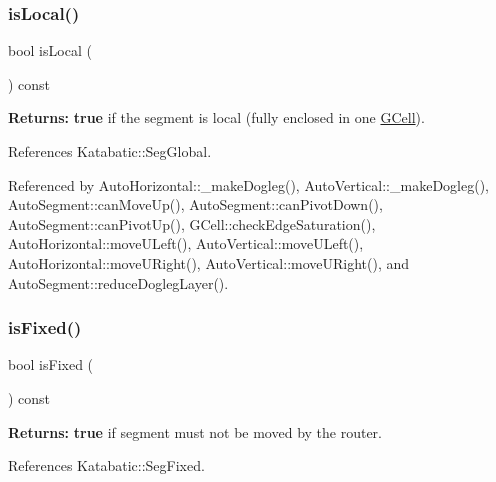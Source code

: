 \mbox{\label{classKatabatic_1_1AutoSegment_add556a145a89fdbcea82346abfb873dc}} 
\subsubsection{\texorpdfstring{is\+Local()}{isLocal()}}
{\footnotesize\ttfamily bool is\+Local (\begin{DoxyParamCaption}{ }\end{DoxyParamCaption}) const\hspace{0.3cm}{\ttfamily [inline]}}

{\bfseries Returns\+:} {\bfseries true} if the segment is local (fully enclosed in one \hyperlink{classKatabatic_1_1GCell}{G\+Cell}). 

References Katabatic\+::\+Seg\+Global.



Referenced by Auto\+Horizontal\+::\+\_\+make\+Dogleg(), Auto\+Vertical\+::\+\_\+make\+Dogleg(), Auto\+Segment\+::can\+Move\+Up(), Auto\+Segment\+::can\+Pivot\+Down(), Auto\+Segment\+::can\+Pivot\+Up(), G\+Cell\+::check\+Edge\+Saturation(), Auto\+Horizontal\+::move\+U\+Left(), Auto\+Vertical\+::move\+U\+Left(), Auto\+Horizontal\+::move\+U\+Right(), Auto\+Vertical\+::move\+U\+Right(), and Auto\+Segment\+::reduce\+Dogleg\+Layer().

\mbox{\label{classKatabatic_1_1AutoSegment_afd7362b850709bed8b61c1aa22399f97}} 
\subsubsection{\texorpdfstring{is\+Fixed()}{isFixed()}}
{\footnotesize\ttfamily bool is\+Fixed (\begin{DoxyParamCaption}{ }\end{DoxyParamCaption}) const\hspace{0.3cm}{\ttfamily [inline]}}

{\bfseries Returns\+:} {\bfseries true} if segment must not be moved by the router. 

References Katabatic\+::\+Seg\+Fixed.



